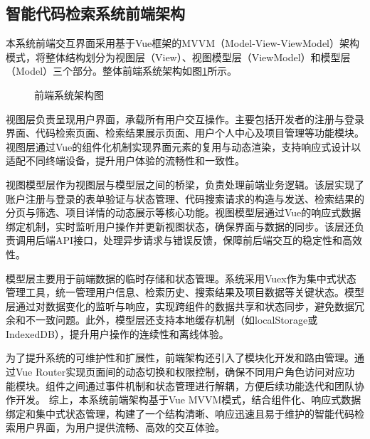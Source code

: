 \documentclass[UTF8,a4paper,12pt]{ctexart}
\numberwithin{equation}{section}
\begin{document}
\subsection{智能代码检索系统前端架构}
本系统前端交互界面采用基于Vue框架的MVVM（Model-View-ViewModel）架构模式，将整体结构划分为视图层（View）、视图模型层（ViewModel）和模型层（Model）三个部分。整体前端系统架构如图\ref{front_model}所示。
\begin{figure}[H]
	\caption{前端系统架构图}
	\label{front_model}
\end{figure}
视图层负责呈现用户界面，承载所有用户交互操作。主要包括开发者的注册与登录界面、代码检索页面、检索结果展示页面、用户个人中心及项目管理等功能模块。视图层通过Vue的组件化机制实现界面元素的复用与动态渲染，支持响应式设计以适配不同终端设备，提升用户体验的流畅性和一致性。\par
视图模型层作为视图层与模型层之间的桥梁，负责处理前端业务逻辑。该层实现了账户注册与登录的表单验证与状态管理、代码搜索请求的构造与发送、检索结果的分页与筛选、项目详情的动态展示等核心功能。视图模型层通过Vue的响应式数据绑定机制，实时监听用户操作并更新视图状态，确保界面与数据的同步。该层还负责调用后端API接口，处理异步请求与错误反馈，保障前后端交互的稳定性和高效性。\par
模型层主要用于前端数据的临时存储和状态管理。系统采用Vuex作为集中式状态管理工具，统一管理用户信息、检索历史、搜索结果及项目数据等关键状态。模型层通过对数据变化的监听与响应，实现跨组件的数据共享和状态同步，避免数据冗余和不一致问题。此外，模型层还支持本地缓存机制（如localStorage或IndexedDB），提升用户操作的连续性和离线体验。\par
为了提升系统的可维护性和扩展性，前端架构还引入了模块化开发和路由管理。通过Vue Router实现页面间的动态切换和权限控制，确保不同用户角色访问对应功能模块。组件之间通过事件机制和状态管理进行解耦，方便后续功能迭代和团队协作开发。
综上，本系统前端架构基于Vue MVVM模式，结合组件化、响应式数据绑定和集中式状态管理，构建了一个结构清晰、响应迅速且易于维护的智能代码检索用户界面，为用户提供流畅、高效的交互体验。
\end{document}
